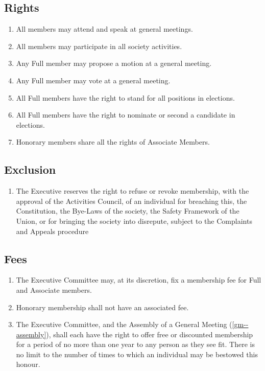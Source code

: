 \documentclass{scrartcl}
\begin{document}
        \subsection{Rights}
            \label{membership--rights}
            \begin{enumerate}
                \item All members may attend and speak at general meetings.
                \item All members may participate in all society activities.
                \item Any Full member may propose a motion at a general meeting.
                \item Any Full member may vote at a general meeting.
                \item All Full members have the right to stand for all positions in elections.
                \item All Full members have the right to nominate or second a candidate in elections.
                \item Honorary members share all the rights of Associate Members.
            \end{enumerate}

        \subsection{Exclusion}
            \label{membership--exclusion}
            \begin{enumerate}
                \item The Executive reserves the right to refuse or revoke membership, with the approval of the Activities Council, of an individual for breaching this, the Constitution, the Bye-Laws of the society, the Safety Framework of the Union, or for bringing the society into disrepute, subject to the Complaints and Appeals procedure 
            \end{enumerate}

        \subsection{Fees}
            \label{membership--fees}
            \begin{enumerate}
                \item The Executive Committee may, at its discretion, fix a membership fee for Full and Associate members.
                \item Honorary membership shall not have an associated fee.
                \item The Executive Committee, and the Assembly of a General Meeting (\ref{gm--assembly}), shall each have the right to offer free or discounted membership for a period of no more than one year to any person as they see fit. There is no limit to the number of times to which an individual may be bestowed this honour.
            \end{enumerate}
\end{document}
